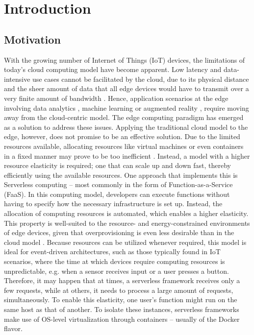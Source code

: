 \chapter{Introduction}
\label{chapter:introduction}

\section{Motivation}

With the growing number of Internet of Things (IoT) devices, the limitations of today's cloud computing model have become apparent. Low latency and data-intensive use cases cannot be facilitated by the cloud, due to its physical distance and the sheer amount of data that all edge devices would have to transmit over a very finite amount of bandwidth \cite{Aslanpour2021}.
Hence, application scenarios at the edge involving data analytics \cite{Nastic2017}, machine learning \cite{Rausch2019} or augmented reality \cite{Baresi2019}, require moving away from the cloud-centric model.
The edge computing paradigm has emerged as a solution to address these issues.
Applying the traditional cloud model to the edge, however, does not promise to be an effective solution. Due to the limited resources available, allocating resources like virtual machines or even containers in a fixed manner may prove to be too inefficient \cite{Baresi2019}.
Instead, a model with a higher resource elasticity is required; one that can scale up and down fast, thereby efficiently using the available resources.
One approach that implements this is Serverless computing -- most commonly in the form of Function-as-a-Service (FaaS).
In this computing model, developers can execute functions without having to specify how the necessary infrastructure is set up. Instead, the allocation of computing resources is automated, which enables a higher elasticity. This property is well-suited to the resource- and energy-constrained environments of edge devices, given that overprovisioning is even less desirable than in the cloud model \cite{Aslanpour2021}.
Because resources can be utilized whenever required, this model is ideal for event-driven architectures, such as those typically found in IoT scenarios, where the time at which devices require computing resources is unpredictable, e.g. when a sensor receives input or a user presses a button. Therefore, it may happen that at times, a serverless framework receives only a few requests, while at others, it needs to process a large amount of requests, simultaneously.
To enable this elasticity, one user's function might run on the same host as that of another. To isolate these instances, serverless frameworks make use of OS-level virtualization through containers -- usually of the Docker flavor.
